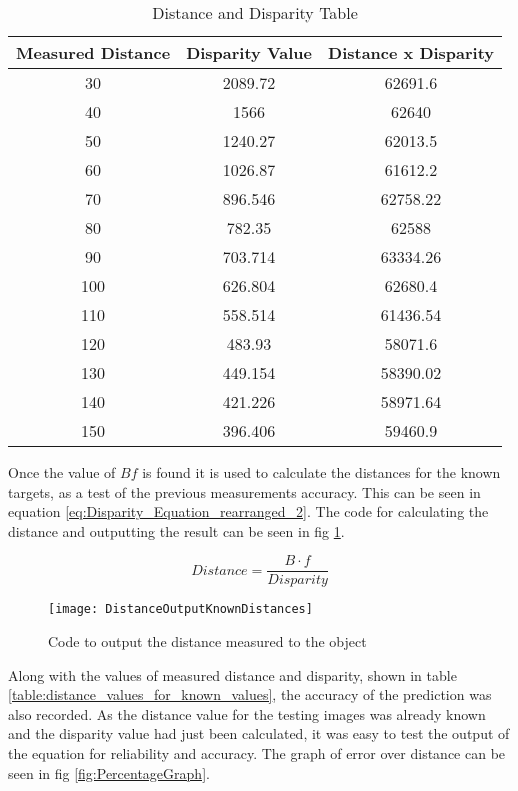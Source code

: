 \documentclass[conference]{IEEEtran}
\begin{document}
\begin{table}
\begin{center}
\caption{Distance and Disparity Table}
\begin{tabular}{ || c || c || c || }
\hline
 Measured Distance & Disparity Value & Distance x Disparity\\ 
\hline
 30 & 2089.72 & 62691.6 \\  
\hline
 40 & 1566 & 62640 \\  
\hline
 50 & 1240.27 & 62013.5 \\  
\hline
 60 & 1026.87 & 61612.2 \\  
\hline
 70 & 896.546 & 62758.22 \\  
\hline
 80 & 782.35 & 62588 \\  
\hline
 90 & 703.714 & 63334.26 \\  
\hline
 100 & 626.804 & 62680.4 \\  
\hline
 110 & 558.514 & 61436.54 \\  
\hline
 120 & 483.93 & 58071.6 \\  
\hline
 130 & 449.154 & 58390.02 \\  
\hline
 140 & 421.226 & 58971.64 \\  
\hline
 150 & 396.406 & 59460.9 \\  
\hline

\end{tabular}
\label{table:distance_and_disparity_tables}
\end{center}
\end{table}

Once the value of $Bf$ is found it is used to calculate the distances for the known targets, as a test of the previous measurements accuracy. This can be seen in equation \ref{eq:Disparity_Equation_rearranged_2}. The code for calculating the distance and outputting the result can be seen in fig \ref{fig:DistanceOutputKnownDistances}.

\begin{equation} \label{eq:Disparity_Equation_rearranged_2}
Distance = \frac{B \cdot f}{Disparity}
\end{equation}

\begin{figure}[H]
\centerline{\texttt{[image: DistanceOutputKnownDistances]}}
\caption{Code to output the distance measured to the object}
\label{fig:DistanceOutputKnownDistances}
\end{figure}

Along with the values of measured distance and disparity, shown in table \ref{table:distance_values_for_known_values}, the accuracy of the prediction was also recorded. As the distance value for the testing images was already known and the disparity value had just been calculated, it was easy to test the output of the equation for reliability and accuracy. The graph of error over distance can be seen in fig \ref{fig:PercentageGraph}.
\end{document}
